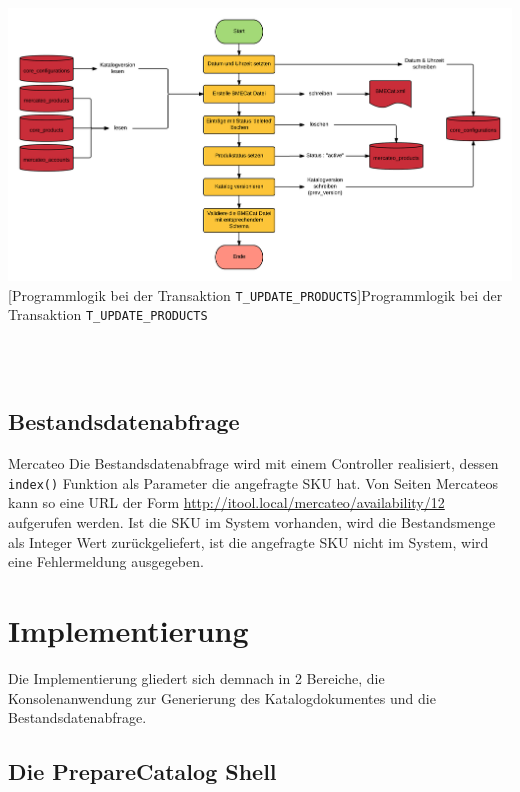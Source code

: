 	\begin{minipage}{\linewidth}
		\vspace{1em}
		\centering
		\includegraphics[width=1 \linewidth]{img/updateCatalogComplete}
		[Programmlogik  bei der Transaktion \texttt{T\_UPDATE\_PRODUCTS}]{Programmlogik  bei der Transaktion \texttt{T\_UPDATE\_PRODUCTS}}
		\vspace{1em}
	\end{minipage}\\
	
	\
	
	\subsection{Bestandsdatenabfrage}
	
	Mercateo 
	Die Bestandsdatenabfrage wird mit einem Controller realisiert, dessen \texttt{index()} Funktion als Parameter die angefragte SKU hat.
	Von Seiten Mercateos kann so eine URL der Form \url{http://itool.local/mercateo/availability/12} aufgerufen werden. Ist die SKU im System vorhanden, wird die Bestandsmenge als Integer Wert zurückgeliefert, ist die angefragte SKU nicht im System, wird eine Fehlermeldung ausgegeben.
	
	\section{Implementierung}
	
	Die Implementierung gliedert sich demnach in 2 Bereiche, die Konsolenanwendung zur Generierung des Katalogdokumentes und die Bestandsdatenabfrage.
	
	\subsection{Die PrepareCatalog Shell}
	
